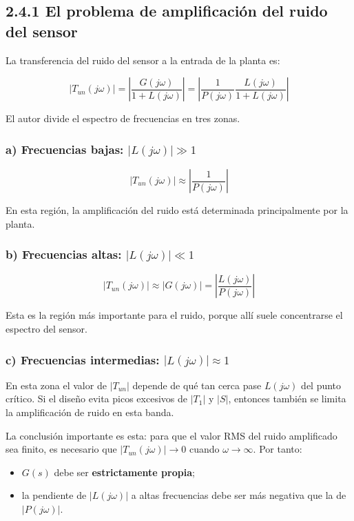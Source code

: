 \subsection{2.4.1 El problema de amplificación del ruido del sensor}
La transferencia del ruido del sensor a la entrada de la planta es:

$$
|T_{un}(j\omega)|=\left|\frac{G(j\omega)}{1+L(j\omega)}\right|
=\left|\frac{1}{P(j\omega)}\frac{L(j\omega)}{1+L(j\omega)}\right|
$$

El autor divide el espectro de frecuencias en tres zonas.

\subsubsection{a) Frecuencias bajas: \(|L(j\omega)|\gg 1\)}
\[
|T_{un}(j\omega)|\approx \left|\frac{1}{P(j\omega)}\right| \tag{2.4.2}
\]

En esta región, la amplificación del ruido está determinada principalmente por la planta.

\subsubsection{b) Frecuencias altas: \(|L(j\omega)|\ll 1\)}
\[
|T_{un}(j\omega)|\approx |G(j\omega)|
=\left|\frac{L(j\omega)}{P(j\omega)}\right| \tag{2.4.3}
\]

Esta es la región más importante para el ruido, porque allí suele concentrarse el espectro del sensor.

\subsubsection{c) Frecuencias intermedias: \(|L(j\omega)|\approx 1\)}
En esta zona el valor de \(|T_{un}|\) depende de qué tan cerca pase \(L(j\omega)\) del punto crítico. Si el diseño evita picos excesivos de \(|T_1|\) y \(|S|\), entonces también se limita la amplificación de ruido en esta banda.


La conclusión importante es esta: para que el valor RMS del ruido amplificado sea finito, es necesario que \(|T_{un}(j\omega)|\to 0\) cuando \(\omega\to\infty\). Por tanto:

\begin{itemize}
  \item \(G(s)\) debe ser \textbf{estrictamente propia};
  \item la pendiente de \(|L(j\omega)|\) a altas frecuencias debe ser más negativa que la de \(|P(j\omega)|\).
\end{itemize}

